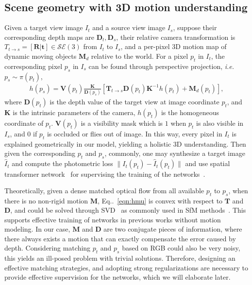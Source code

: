 \documentclass[runningheads]{llncs}
\makeatletter
\newcommand{\equref}[1]{Eq\onedot~\eqref{#1}}
\newcommand{\ve}[1]{{\mathbf #1}} \newcommand{\hua}[1]{{\mathcal #1}}
\DeclareRobustCommand\onedot{\futurelet\@let@token\@onedot}
\def\onedot{\ifx\@let@token.\else.\null\fi\xspace}
\def\ie{\emph{i.e.}}
\makeatother
\begin{document}
\vspace{-0.5\baselineskip}
\subsection{Scene geometry with 3D motion understanding}
\label{subsec:scene_geometry}
 Given a target view image $I_t$ and a source view image $I_s$, suppose their corresponding depth maps are $\ve{D}_t, \ve{D}_s$, their relative camera  
 transformation is $T_{t\rightarrow s} = [\ve{R} | \ve{t}] \in \hua{S}\hua{E}(3)$ from $I_t$ to $I_s$, and 
 a per-pixel 3D motion map of dynamic moving objects $\ve{M}_d$ relative to the world.
 For a pixel $p_t$ in $I_t$, the corresponding pixel $p_s$ in $I_s$ can be found through perspective projection, \ie $p_s \sim \pi(p_t)$, 
\begin{align}
h(p_s) = \ve{V}(p_t)\frac{\ve{K}}{\ve{D}(p_s)}[\ve{T}_{t\rightarrow s}\ve{D}(p_t)\ve{K}^{-1}h(p_t) + \ve{M}_d(p_t)], 
\label{eqn:hmu}
\end{align}
where $\ve{D}(p_t)$ is the depth value of the target view at image coordinate $p_t$, and $\ve{K}$ is the intrinsic parameters of the camera, $h(p_t)$ is the homogeneous coordinate of $p_t$. $\ve{V}(p_t)$ is a visibility mask which is $1$ when $p_t$ is also visible in $I_s$, and $0$ if $p_t$ is occluded or flies out of image. In this way, every pixel in $I_t$ is explained geometrically in our model, yielding a holistic 3D understanding. Then given the corresponding $p_t$ and $p_s$, commonly, one may synthesize a target image $\hat{I}_t$ and compute the photometric loss $\|I_t(p_t) - \hat{I}_t(p_t)\|$ and use spatial transformer network~\cite{jaderberg2015spatial} for supervising the training of the networks~\cite{zhou2017unsupervised}.

Theoretically, given a dense matched optical flow from all available $p_t$ to $p_s$, when there is no non-rigid motion $\ve{M}$, \equref{eqn:hmu} is convex with respect to $\ve{T}$ and $\ve{D}$, and could be solved through SVD~\cite{tomasi1992shape} as commonly used in SfM methods~\cite{wu2011visualsfm}. This supports effective training of networks in previous works without motion modeling. 
In our case, $\ve{M}$ and $\ve{D}$ are two conjugate pieces of information, where there always exists a motion that can exactly compensate the error caused by depth. Considering matching $p_t$ and $p_s$ based on RGB could also be very noisy, this yields an ill-posed problem with trivial solutions.  Therefore, designing an effective matching strategies, and adopting strong regularizations are necessary to provide effective supervision for the networks, which we will elaborate later.
\end{document}
